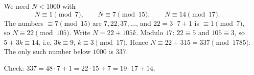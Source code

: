 We need $N<1000$ with
\[N\equiv1\pmod7,\qquad N\equiv7\pmod{15},\qquad N\equiv14\pmod{17}.\]
The numbers $\equiv7\pmod{15}$ are $7,22,37,\dots$, and $22=3\cdot7+1$ is $\equiv1\pmod7$, so $N\equiv22\pmod{105}$. Write $N=22+105k$. Modulo $17$: $22\equiv5$ and $105\equiv3$, so $5+3k\equiv14$, i.e. $3k\equiv9$, $k\equiv3\pmod{17}$. Hence $N\equiv22+315=337\pmod{1785}$. The only such number below $1000$ is $\boxed{337}$.

Check: $337=48\cdot7+1=22\cdot15+7=19\cdot17+14$.
